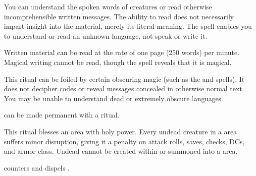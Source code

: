 \spellrng{\rngpers}
\spelldur{\durlong}
\begin{spelleffect}
  You can understand the spoken words of creatures or read otherwise incomprehensible written messages. The ability to read does not necessarily impart insight into the material, merely its literal meaning. The spell enables you to understand or read an unknown language, not speak or write it.
  \par Written material can be read at the rate of one page (250 words) per minute. Magical writing cannot be read, though the spell reveals that it is magical. 
\end{spelleffect}
\begin{spellnotes}
  This ritual can be foiled by certain obscuring magic (such as the  and  spells). It does not decipher codes or reveal messages concealed in otherwise normal text. You may be unable to understand dead or extremely obscure languages.

   can be made permanent with a  ritual.
\end{spellnotes}

\spellrng{\rngclose}
\begin{spelleffect}
This ritual blesses an area with holy power. Every undead creature in a  area suffers minor disruption, giving it a  penalty on attack rolls, saves, checks, DCs, and armor class. Undead cannot be created within or summoned into a  area.
\end{spelleffect}
\begin{spellnotes}
\par {} counters and dispels .
\end{spellnotes}

